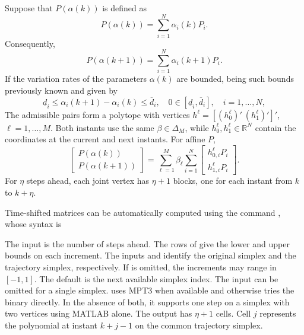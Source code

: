 \documentclass[english,11pt]{article}
\theoremstyle{break} \theorembodyfont{\small\rm}
\begin{document}
Suppose that $P(\alpha(k))$ is defined as
\[
 P(\alpha(k)) = \sum_{i=1}^N \alpha_i(k) P_i.
\]
Consequently,
\[
 P(\alpha(k+1)) = \sum_{i=1}^N \alpha_i(k+1) P_i.
\]
If the variation rates of the parameters $\alpha(k)$ are bounded, being such bounds previously known and given by
\[
 \underline{d}_i \leq \alpha_i(k+1) - \alpha_i(k) \leq \overline{d}_i, \quad 0 \in [\underline{d}_i, \overline{d}_i], \quad i = 1, \ldots, N,
\]
The admissible pairs form a polytope with vertices
$h^\ell=[(h_0^\ell)' \ (h_1^\ell)']'$, $\ell=1,\ldots,M$.
Both instants use the same $\beta\in\Delta_M$, while
$h_0^\ell,h_1^\ell\in\mathbb R^N$ contain the coordinates at the
current and next instants. For affine $P$,
\[
 \begin{bmatrix}P(\alpha(k))\\ P(\alpha(k+1))\end{bmatrix}
 =\sum_{\ell=1}^{M}\beta_\ell\sum_{i=1}^N
 \begin{bmatrix}h_{0,i}^\ell P_i\\h_{1,i}^\ell P_i\end{bmatrix}.
\]
For $\eta$ steps ahead, each joint vertex has $\eta+1$ blocks,
one for each instant from $k$ to $k+\eta$.


Time-shifted matrices can be automatically computed using the command , whose syntax is

\vspace{0.5cm}%
\noindent\begin{minipage}{\linewidth}
\end{minipage}
\vspace{0.2cm}

The input  is the number of steps ahead. The rows of
 give the lower and upper bounds on each increment.
The inputs  and  identify the original
simplex and the trajectory simplex, respectively.
If  is omitted, the increments may range in $[-1,1]$.
The default  is the next available simplex index.
The input  can be omitted for a single simplex.
 uses MPT3 when available and otherwise tries the
 binary directly. In the absence of both, it supports
one step on a simplex with two vertices using MATLAB alone.
The output has $\eta+1$ cells. Cell $j$ represents the polynomial at
instant $k+j-1$ on the common trajectory simplex.
\end{document}
